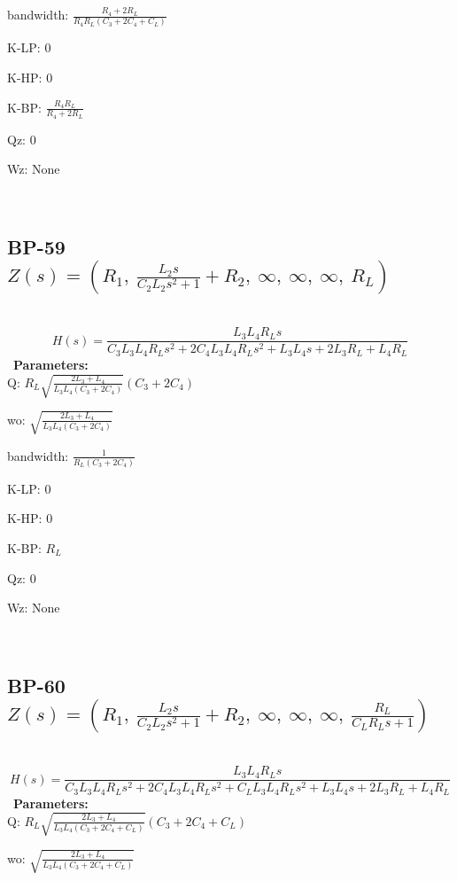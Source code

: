 \documentclass{article}
\begin{document}
bandwidth: $\frac{R_{4} + 2 R_{L}}{R_{4} R_{L} \left(C_{3} + 2 C_{4} + C_{L}\right)}$\ 

K-LP: $0$\ 

K-HP: $0$\ 

K-BP: $\frac{R_{4} R_{L}}{R_{4} + 2 R_{L}}$\ 

Qz: $0$\ 

Wz: $\text{None}$\ 

\ 

\subsection{BP-59 $Z(s) = \left( R_{1}, \  \frac{L_{2} s}{C_{2} L_{2} s^{2} + 1} + R_{2}, \  \infty, \  \infty, \  \infty, \  R_{L}\right)$ } \ 
\textbf{\[H(s) = \frac{L_{3} L_{4} R_{L} s}{C_{3} L_{3} L_{4} R_{L} s^{2} + 2 C_{4} L_{3} L_{4} R_{L} s^{2} + L_{3} L_{4} s + 2 L_{3} R_{L} + L_{4} R_{L}}\] } \ 
\textbf{Parameters:}\\ 

Q: $R_{L} \sqrt{\frac{2 L_{3} + L_{4}}{L_{3} L_{4} \left(C_{3} + 2 C_{4}\right)}} \left(C_{3} + 2 C_{4}\right)$\ 

wo: $\sqrt{\frac{2 L_{3} + L_{4}}{L_{3} L_{4} \left(C_{3} + 2 C_{4}\right)}}$\ 

bandwidth: $\frac{1}{R_{L} \left(C_{3} + 2 C_{4}\right)}$\ 

K-LP: $0$\ 

K-HP: $0$\ 

K-BP: $R_{L}$\ 

Qz: $0$\ 

Wz: $\text{None}$\ 

\ 

\subsection{BP-60 $Z(s) = \left( R_{1}, \  \frac{L_{2} s}{C_{2} L_{2} s^{2} + 1} + R_{2}, \  \infty, \  \infty, \  \infty, \  \frac{R_{L}}{C_{L} R_{L} s + 1}\right)$ } \ 
\textbf{\[H(s) = \frac{L_{3} L_{4} R_{L} s}{C_{3} L_{3} L_{4} R_{L} s^{2} + 2 C_{4} L_{3} L_{4} R_{L} s^{2} + C_{L} L_{3} L_{4} R_{L} s^{2} + L_{3} L_{4} s + 2 L_{3} R_{L} + L_{4} R_{L}}\] } \ 
\textbf{Parameters:}\\ 

Q: $R_{L} \sqrt{\frac{2 L_{3} + L_{4}}{L_{3} L_{4} \left(C_{3} + 2 C_{4} + C_{L}\right)}} \left(C_{3} + 2 C_{4} + C_{L}\right)$\ 

wo: $\sqrt{\frac{2 L_{3} + L_{4}}{L_{3} L_{4} \left(C_{3} + 2 C_{4} + C_{L}\right)}}$\ 
\end{document}
